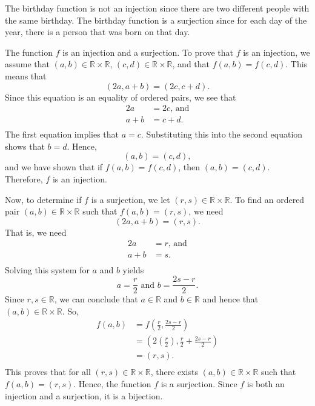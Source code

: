 \begin{list}{\bf{\ref{exer:sec63-9}.}}
\item The birthday function is not an injection since there are two different people with the same birthday.  The birthday function is a surjection since for each day of the year, there is a person that was born on that day.
\end{list}

\begin{list}{\bf{\ref{exer:sec63-11}.}}
\item \begin{list}{\bf{(a)}}
\item The function  $f$  is an injection and a surjection.  To prove that $f$  is an injection, we assume that  
$( {a, b} ) \in \mathbb{R} \times \mathbb{R}$, 
$( {c, d} ) \in \mathbb{R} \times \mathbb{R}$, and that  
$f( {a, b} ) = f( {c, d} )$.  This means that
\[
( {2a, a + b} ) = ( {2c, c + d} ).
\]
Since this equation is an equality of ordered pairs, we see that
\[
\begin{aligned}
       2a &= 2c \text{, and} \\ 
    a + b &= c + d. \\ 
\end{aligned}
\]
The first equation implies that $a = c$.  Substituting this into the second equation shows that 
$b = d$.  Hence, 
\[
( {a, b} ) = ( {c, d} ),
\]
and we have shown that if $f( {a, b} ) = f( {c, d} )$, then  
$( {a, b} ) = ( {c, d} )$.  Therefore,  $f$  is an injection.

Now, to determine if  $f$  is a surjection, we let  
$( {r, s} ) \in \mathbb{R} \times \mathbb{R}$. To find an ordered pair 
$( {a, b} ) \in \mathbb{R} \times \mathbb{R}$ such that  
$f( {a, b} ) = ( {r, s} )$, we need
\[
( {2a, a + b} ) = ( {r, s} ).
\]
That is, we need
\[
\begin{aligned}
      2a &= r\text{, and} \\ 
   a + b &= s. \\ 
\end{aligned}
\]
Solving this system for  $a$  and  $b$  yields  
\[
a = \frac{{r}}{2} \text{ and } b = \frac{{2s - r}}{2}.
\]
Since  $r, s \in \mathbb{R}$, we can conclude that  $a \in \mathbb{R}$ and 
$b \in \mathbb{R}$ and hence that  
\mbox{$( {a, b} ) \in \mathbb{R} \times \mathbb{R}$}.  So,
\[
\begin{aligned}
  f( {a, b} ) &= f\left( {\frac{{r}}{2}, \frac{{2s - r}}{2}} \right) \\ 
                         &= \left( {2\left( {\frac{{r}}{2}} \right),\frac{{r}}{2} + \frac{{2s - r}}{2}} \right) \\ 
                         &= ( {r, s} ). \\ 
\end{aligned} 
\]
This proves that for all  $( {r, s} ) \in \mathbb{R} \times \mathbb{R}$, there exists  $( {a, b} ) \in \mathbb{R} \times \mathbb{R}$ such that  
$f( {a, b} ) = ( {r, s} )$.  Hence, the function  $f$  is a surjection.  Since  $f$  is both an injection and a surjection,  it is a bijection.
\end{list}
\end{list}

